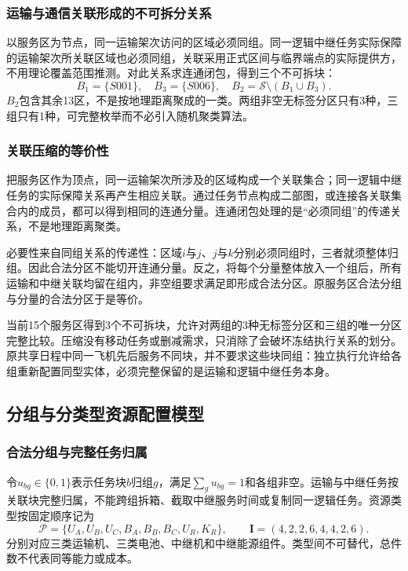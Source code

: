 \documentclass[withoutpreface,colorprint]{format}
\numberwithin{equation}{section}
\numberwithin{figure}{section}
\numberwithin{table}{section}
\begin{document}
\subsubsection{运输与通信关联形成的不可拆分关系}
以服务区为节点，同一运输架次访问的区域必须同组。同一逻辑中继任务实际保障的运输架次所关联区域也必须同组，关联采用正式区间与临界端点的实际提供方，不用理论覆盖范围推测。对此关系求连通闭包，得到三个不可拆块：
\begin{equation}
 B_1=\{S001\},\quad B_3=\{S006\},\quad
 B_2=\mathcal S\setminus(B_1\cup B_3).
\label{eq:q4_blocks}
\end{equation}
$B_2$包含其余13区，不是按地理距离聚成的一类。两组非空无标签分区只有3种，三组只有1种，可完整枚举而不必引入随机聚类算法。


\subsubsection{关联压缩的等价性}
把服务区作为顶点，同一运输架次所涉及的区域构成一个关联集合；同一逻辑中继任务的实际保障关系再产生相应关联。通过任务节点构成二部图，或连接各关联集合内的成员，都可以得到相同的连通分量。连通闭包处理的是“必须同组”的传递关系，不是地理距离聚类。

必要性来自同组关系的传递性：区域$i$与$j$、$j$与$k$分别必须同组时，三者就须整体归组。因此合法分区不能切开连通分量。反之，将每个分量整体放入一个组后，所有运输和中继关联均留在组内，非空组要求满足即形成合法分区。原服务区合法分组与分量的合法分区于是等价。

当前15个服务区得到3个不可拆块，允许对两组的3种无标签分区和三组的唯一分区完整比较。压缩没有移动任务或删减需求，只消除了会破坏冻结执行关系的划分。原共享日程中同一飞机先后服务不同块，并不要求这些块同组：独立执行允许给各组重新配置同型实体，必须完整保留的是运输和逻辑中继任务本身。


\subsection{分组与分类型资源配置模型}
\subsubsection{合法分组与完整任务归属}
令$u_{bg}\in\{0,1\}$表示任务块$b$归组$g$，满足$\sum_gu_{bg}=1$和各组非空。运输与中继任务按关联块完整归属，不能跨组拆箱、截取中继服务时间或复制同一逻辑任务。资源类型按固定顺序记为
\begin{equation}
 \mathcal P=\{U_A,U_B,U_C,B_A,B_B,B_C,U_R,K_R\},\qquad
 \boldsymbol I=(4,2,2,6,4,4,2,6).
\label{eq:q4_inventory}
\end{equation}
分别对应三类运输机、三类电池、中继机和中继能源组件。类型间不可替代，总件数不代表同等能力或成本。
\end{document}
